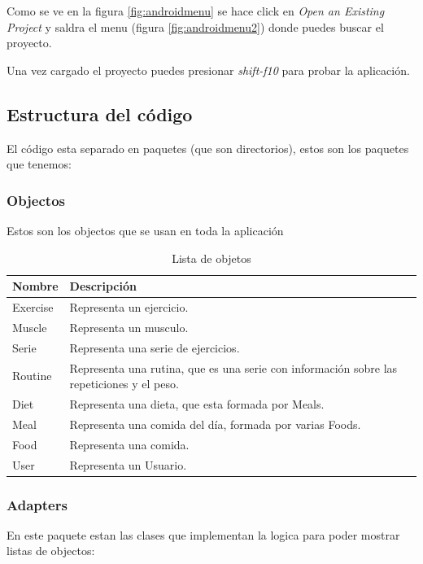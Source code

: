 \documentclass[12pt,a4paper]{article}
\begin{document}
Como se ve en la figura \ref{fig:androidmenu} se hace click en \textit{Open an Existing Project} y saldra el menu (figura \ref{fig:androidmenu2}) donde puedes buscar el proyecto.

Una vez cargado el proyecto puedes presionar \textit{shift-f10 }para probar la aplicación.

\subsection{Estructura del código}

El código esta separado en paquetes (que son directorios), estos son los paquetes que tenemos:

\subsubsection{Objectos}
Estos son los objectos que se usan en toda la aplicación

\begin{table}[h!]
\centering
\begin{tabular}{  |l|l| }
\hline
Nombre & Descripción \\
\hline
 Exercise & Representa un ejercicio. \\ 
 \hline
 Muscle & Representa un musculo. \\ 
 \hline
  Serie & Representa una serie de ejercicios. \\ 
 \hline
  Routine & Representa una rutina, que es una serie con información sobre las repeticiones y el peso. \\ 
 \hline
  Diet & Representa una dieta, que esta formada por Meals. \\ 
 \hline
  Meal & Representa una comida del día, formada por varias Foods. \\ 
 \hline
  Food & Representa una comida. \\ 
 \hline
 User & Representa un Usuario. \\ 
 \hline
\end{tabular}
\caption{Lista de objetos}
\end{table}


\subsubsection{Adapters}
En este paquete estan las clases que implementan la logica para poder mostrar listas de objectos:
\end{document}
